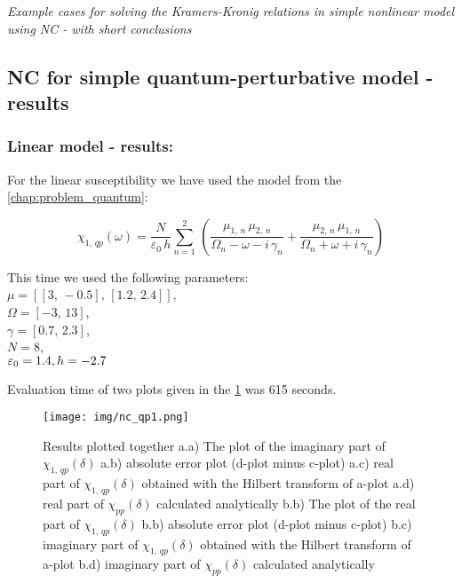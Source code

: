 \documentclass[12pt,twoside,a4paper]{article}
\numberwithin{equation}{subsection}
\numberwithin{figure}{subsection}
\begin{document}
\textit{Example cases for solving the Kramers-Kronig relations in simple nonlinear model using NC - with short conclusions}

\subsection{NC for simple quantum-perturbative model - results} \label{chap:nc_quantum}

\subsubsection*{Linear model - results:}

For the linear susceptibility we have used the model from the \ref{chap:problem_quantum}: 

\begin{equation} \label{nclin_chipp}
  {\chi_{1, \,qp}}(\omega ) = \frac {N}{\varepsilon_0\,h} \sum_{n=1}^{2}\,(\frac {{\mu_{1, \,n}}\,{ \mu_{2, \,n}}}{{\Omega_{n}}
  - \omega  - i\,{\gamma_{n}}} + \frac {{\mu_{2, \,n}}\,{\mu_{1, \,n}}}{{\Omega_{n}} + \omega + i\,{\gamma_{n}}})
\end{equation}

This time we used the following parameters: \\
$\mu = [[3, \, - 0.5], \,[1.2, \,2.4]]$, \\ 
$\Omega =[ - 3, \,13]$, \\
$\gamma =[0.7, \,2.3]$, \\ 
$N=8$, \\ 
${\varepsilon_{0}}=1.4, \\
h= - 2.7$

Evaluation time of two plots given in the \ref{fig:nc_qp1} was 615 seconds.

\begin{figure}
  \texttt{[image: img/nc\_qp1.png]}
  \caption{Results plotted together 
    a.a) The plot of the imaginary part of ${\chi_{1, \,qp}}(\delta )$
    a.b) absolute error plot (d-plot minus c-plot) 
    a.c) real part of ${\chi_{1, \,qp}}(\delta )$ obtained with the Hilbert transform of a-plot 
    a.d) real part of ${\chi_{pp}}(\delta )$ calculated analytically 
    b.b) The plot of the real part of ${\chi_{1, \,qp}}(\delta )$ 
    b.b) absolute error plot (d-plot minus c-plot) 
    b.c) imaginary part of ${\chi_{1, \,qp}}(\delta )$ obtained with the Hilbert transform of a-plot 
    b.d) imaginary part of ${\chi_{pp}}(\delta )$ calculated analytically  
    \label{fig:nc_qp1}
  }
\end{figure}
\end{document}
